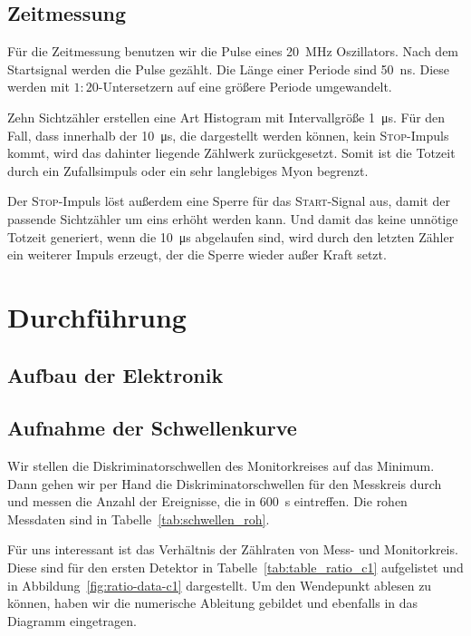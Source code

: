 \documentclass[11pt, ngerman, fleqn, DIV=15, headinclude, BCOR=2cm]{scrreprt}
\begin{document}
\subsection{Zeitmessung}

Für die Zeitmessung benutzen wir die Pulse eines \SI{20}{\mega\hertz}
Oszillators. Nach dem Startsignal werden die Pulse gezählt. Die Länge einer
Periode sind \SI{50}{\nano\second}. Diese werden mit $1:20$-Untersetzern
auf eine größere Periode umgewandelt.

Zehn Sichtzähler erstellen eine Art Histogram mit Intervallgröße
\SI{1}{\micro\second}. Für den Fall, dass innerhalb der \SI{10}{\micro\second},
die dargestellt werden können, kein \textsc{Stop}-Impuls kommt, wird das
dahinter liegende Zählwerk zurückgesetzt. Somit ist die Totzeit durch ein
Zufallsimpuls oder ein sehr langlebiges Myon begrenzt.

Der \textsc{Stop}-Impuls löst außerdem eine Sperre für das
\textsc{Start}-Signal aus, damit der passende Sichtzähler um eins erhöht werden
kann. Und damit das keine unnötige Totzeit generiert, wenn die
\SI{10}{\micro\second} abgelaufen sind, wird durch den letzten Zähler ein
weiterer Impuls erzeugt, der die Sperre wieder außer Kraft setzt.

\section{Durchführung}

\subsection{Aufbau der Elektronik}


\subsection{Aufnahme der Schwellenkurve}

Wir stellen die Diskriminatorschwellen des Monitorkreises auf das Minimum. Dann
gehen wir per Hand die Diskriminatorschwellen für den Messkreis durch und
messen die Anzahl der Ereignisse, die in \SI{600}{\second} eintreffen. Die
rohen Messdaten sind in Tabelle~\ref{tab:schwellen_roh}.

Für uns interessant ist das Verhältnis der Zählraten von Mess- und
Monitorkreis. Diese sind für den ersten Detektor in
Tabelle~\ref{tab:table_ratio_c1} aufgelistet und in
Abbildung~\ref{fig:ratio-data-c1} dargestellt. Um den Wendepunkt ablesen zu
können, haben wir die numerische Ableitung gebildet und ebenfalls in das
Diagramm eingetragen.
\end{document}
